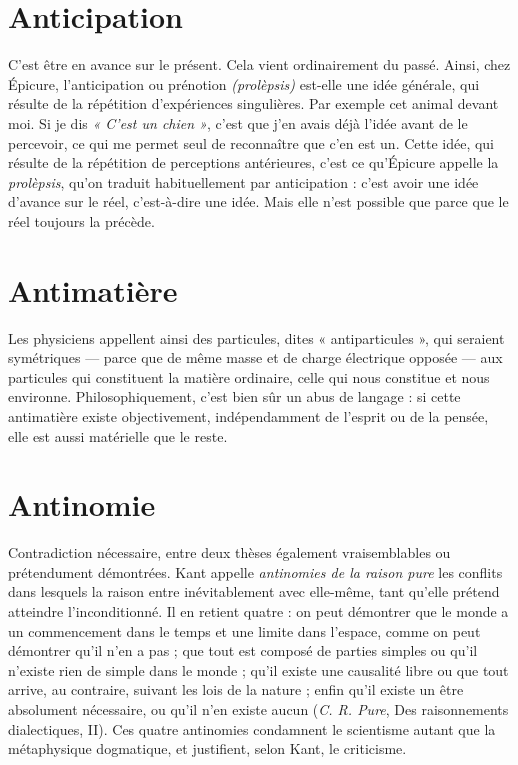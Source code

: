 \section{Anticipation}
C'est être en avance sur le présent. Cela vient ordinairement
du passé. Ainsi, chez Épicure, l’anticipation ou prénotion
{\it (prolèpsis)} est-elle une idée générale, qui résulte de la répétition d’expériences
singulières. Par exemple cet animal devant moi. Si je dis {\it « C'est un chien »},
c'est que j'en avais déjà l’idée avant de le percevoir, ce qui me permet seul de
reconnaître que c’en est un. Cette idée, qui résulte de la répétition de perceptions
antérieures, c’est ce qu'Épicure appelle la {\it prolèpsis}, qu’on traduit habituellement
par anticipation : c’est avoir une idée d’avance sur le réel, c’est-à-dire une idée.
Mais elle n’est possible que parce que le réel toujours la précède.

\section{Antimatière}
Les physiciens appellent ainsi des particules, dites « antiparticules »,
qui seraient symétriques — parce que de même
masse et de charge électrique opposée — aux particules qui constituent la
matière ordinaire, celle qui nous constitue et nous environne. Philosophiquement,
c’est bien sûr un abus de langage : si cette antimatière existe objectivement,
indépendamment de l'esprit ou de la pensée, elle est aussi matérielle que
le reste.

\section{Antinomie}
Contradiction nécessaire, entre deux thèses également vraisemblables
ou prétendument démontrées. Kant appelle {\it antinomies
de la raison pure} les conflits dans lesquels la raison entre inévitablement
avec elle-même, tant qu’elle prétend atteindre l’inconditionné. Il en retient
quatre : on peut démontrer que le monde a un commencement dans le temps
et une limite dans l’espace, comme on peut démontrer qu’il n’en a pas ; que
tout est composé de parties simples ou qu’il n’existe rien de simple dans le
monde ; qu’il existe une causalité libre ou que tout arrive, au contraire, suivant
les lois de la nature ; enfin qu’il existe un être absolument nécessaire, ou qu’il
n’en existe aucun ({\it C. R. Pure}, Des raisonnements dialectiques, II). Ces quatre
antinomies condamnent le scientisme autant que la métaphysique dogmatique,
et justifient, selon Kant, le criticisme.

